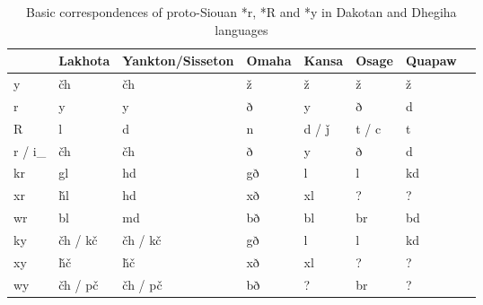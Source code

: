 \documentclass[oneside,a4paper,11pt]{article}
\newcommand{\ipa}[1]{{\phon#1}} %
\begin{document}
\begin{table}[h]
\caption{Basic correspondences of proto-Siouan *r, *R and *y in Dakotan and Dhegiha languages} \label{tab:basic} \centering
\begin{tabular}{l|ll|lllll}
\toprule
  & 	Lakhota  & 	Yankton/Sisseton & 	 Omaha  & 	 Kansa  & 	 Osage  & 	 Quapaw  &	\\	
  \midrule
\ipa{*y} & 	\ipa{čh} & 	\ipa{čh} & 	\ipa{ž} & 	\ipa{ž} & 	\ipa{ž} & 	\ipa{ž} & 	\\	
\ipa{*r} & 	\ipa{y} & 	\ipa{y} & 	\ipa{ð} & 	\ipa{y} & 	\ipa{ð} & 	\ipa{d} & 	\\	
\ipa{*R } & 	\ipa{l} & 	\ipa{d} & 	\ipa{n} & 	\ipa{d / ǰ} & 	\ipa{t / c} & 	\ipa{t} & 	\\	
\ipa{*r / i\_} & 	\ipa{čh} & 	\ipa{čh} & 	\ipa{ð} & 	\ipa{y} & 	\ipa{ð} & 	\ipa{d} & 	\\	
\midrule
\ipa{*kr} & 	\ipa{gl} & 	\ipa{hd} & 	\ipa{gð} & 	\ipa{l} & 	\ipa{l} & 	\ipa{kd} & 	\\		
\ipa{*xr} & 	\ipa{ȟl} & 	\ipa{hd} & 	\ipa{xð} & 	\ipa{xl} & 	? & 	? & 	\\		
\ipa{*wr} & 	\ipa{bl} & 	\ipa{md} & 	\ipa{bð} & 	\ipa{bl} & 	\ipa{br} & 	\ipa{bd} & 	\\		
\midrule
\ipa{*ky} & 	\ipa{čh / kč} & 	\ipa{čh / kč} & 	\ipa{gð} & 	\ipa{l} & 	\ipa{l} & 	\ipa{kd} & 	\\	
\ipa{*xy} & 	\ipa{ȟč} & 	\ipa{ȟč} & 	\ipa{xð} & 	\ipa{xl} & 	? & 	? & 	\\	
\ipa{*wy} & 	\ipa{čh / pč} & 	\ipa{čh / pč} & 	\ipa{bð} & 	? & 	\ipa{br} & 	? & 	\\	
\bottomrule
\end{tabular}
\end{table}
\end{document}
